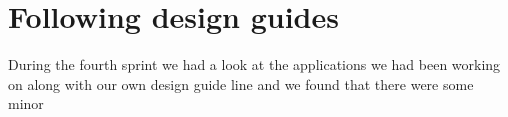 
\section{Following design guides}
\label{sec:following_design_guides}

During the fourth sprint we had a look at the applications we had been working on along with our own design guide line and we found that there were some minor 


